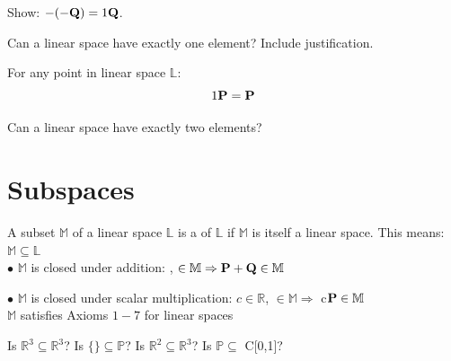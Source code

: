 \begin{myexb}[\bd{b}]
   Show: $-(-\textbf{Q})=1\textbf{Q}$.
\end{myexb}

\begin{myexc}[\bd{c}]
	Can a linear space have exactly one element?  Include justification. 
\end{myexc}

\begin{theorem}
	For any point  in linear space $\mathbb{L}$:
	\[1\textbf{P} = \textbf{P} \]
\end{theorem}
\vspace{-.3in}\hspace{5in}\begin{annotation}
\end{annotation}


\noindent {} Can a linear space have exactly two elements?

\section{Subspaces }    \label{Subspaces}

\begin{defn} 
	A subset $\mathbb{M}$ of a linear space $\mathbb{L}$ is a  of $\mathbb{L}$ if $\mathbb{M}$ is itself a linear space.  This means:\\
     
	 \indent  $\mathbb{M}\subseteq \mathbb{L}$  \\
	 
	  $\bullet$ $\mathbb{M}$ is closed under addition: ,  $\in \mathbb{M} \Rightarrow \textbf{P} + \textbf{Q} \in \mathbb{M} $ 
	 
	  $\bullet$ $\mathbb{M}$ is closed under scalar multiplication: $c \in \mathbb{R}$,  $\in \mathbb{M} \Rightarrow $ c$\textbf{P} \in \mathbb{M}$ \\
	  
	 $\mathbb{M}$ satisfies Axioms $1- 7$ for linear spaces\\

\end{defn}

\begin{myexa}[\bd{a}]
   Is $\mathbb{R}^3 \subseteq \mathbb{R}^3$? \quad Is $\{\} \subseteq \mathbb{P}$? \quad Is $\mathbb{R}^2 \subseteq \mathbb{R}^3$? \quad Is $\mathbb{P} \subseteq$ C[0,1]?
\end{myexa}

